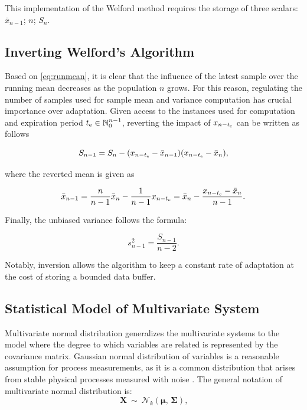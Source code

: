 This implementation of the Welford method requires the storage of three scalars: \(\bar x_{n-1}\); \(n\); \(S_n\).

\subsection{Inverting Welford's Algorithm}\label{AA:InvWelford}
Based on \eqref{eq:runmean}, it is clear that the influence of the latest sample over the running mean decreases as the population \(n\) grows. For this reason, regulating the number of samples used for sample mean and variance computation has crucial importance over adaptation. Given access to the instances used for computation and expiration period \(t _{\text{e}} \in \mathbb{N}_{0}^{n-1}\), reverting the impact of \(x_{n-t _{\text{e}}}\) can be written as follows

\begin{equation}
S_{n-1} = S_n - (x_{n-t _{\text{e}}} - \bar x_{n-1})(x_{n-t _{\text{e}}} - \bar x_n)\text{,}\label{eq:revrunmean}
\end{equation}

where the reverted mean is given as

\begin{equation}
\bar x_{n-1} = \frac{n}{n-1} \bar x_{n} - \frac{1}{n-1}x_{n-t _{\text{e}}} = \bar x_{n} - \frac{x_{n-t _{\text{e}}} - \bar x_{n}}{n-1}\text{.}\label{eq:revmean}
\end{equation}


Finally, the unbiased variance follows the formula:

\begin{equation}
s^2_{n-1} = \frac{S_{n-1}}{n-2}\text{.}\label{eq:revvar}
\end{equation}

Notably, inversion allows the algorithm to keep a constant rate of adaptation at the cost of storing a bounded data buffer.

\subsection{Statistical Model of Multivariate System}\label{AA:Distribution}
Multivariate normal distribution generalizes the multivariate systems to the model where the degree to which variables are related is represented by the covariance matrix. Gaussian normal distribution of variables is a reasonable assumption for process measurements, as it is a common distribution that arises from stable physical processes measured with noise \citep{Mishra201831}. The general notation of multivariate normal distribution is:
\begin{equation}
 \mathbf{X}\ \sim\ \mathcal{N}_k(\boldsymbol\mu,\, \boldsymbol\Sigma)\text{,}\label{eq:distribution}
\end{equation}

